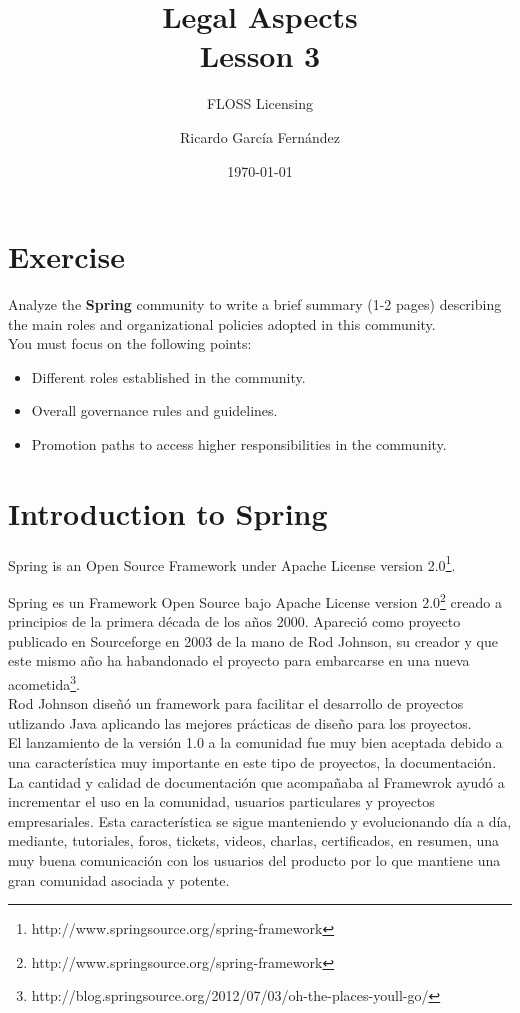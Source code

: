 \documentclass[11pt]{scrartcl}
\title{\textbf{Legal Aspects\\
				Lesson 3}}
\subtitle{FLOSS Licensing}
\author{Ricardo Garc\'ia Fern\'andez}
\date{\today}
\begin{document}
\maketitle

\section{Exercise}

Analyze the \textbf{Spring} community to write a brief summary (1-2 pages) describing the main roles and organizational policies adopted in this community.\\

You must focus on the following points:

\begin{itemize}

	\item Different roles established in the community.
	\item Overall governance rules and guidelines.
	\item Promotion paths to access higher responsibilities in the community.
\end{itemize}

\section{Introduction to Spring}


Spring is an Open Source Framework under Apache License version 2.0\footnote{http://www.springsource.org/spring-framework}.

Spring es un Framework Open Source bajo Apache License version 2.0\footnote{http://www.springsource.org/spring-framework} creado a principios de la primera d\'ecada de los a\~nos 2000. Apareci\'o como proyecto publicado en Sourceforge en 2003 de la mano de Rod Johnson, su creador y que este mismo a\~no ha habandonado el proyecto para embarcarse en una nueva acometida\footnote{http://blog.springsource.org/2012/07/03/oh-the-places-youll-go/}.\\

Rod Johnson dise\~n\'o un framework para facilitar el desarrollo de proyectos utlizando Java aplicando las mejores pr\'acticas de dise\~no para los proyectos.\\

El lanzamiento de la versi\'on 1.0 a la comunidad fue muy bien aceptada debido a una caracter\'istica muy importante en este tipo de proyectos, la documentaci\'on. La cantidad y calidad de documentaci\'on que acompa\~naba al Framewrok ayud\'o a incrementar el uso en la comunidad, usuarios particulares y proyectos empresariales.
Esta caracter\'istica se sigue manteniendo y evolucionando d\'ia a d\'ia, mediante, tutoriales, foros, tickets, videos, charlas, certificados, en resumen, una muy buena comunicaci\'on con los usuarios del producto por lo que mantiene una gran comunidad asociada y potente.
\end{document}
